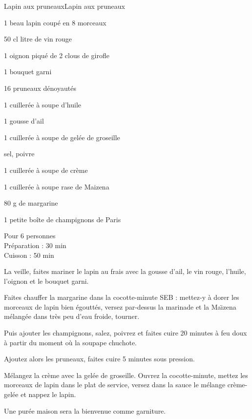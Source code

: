 \begin{recette}{Lapin aux pruneaux}{Lapin aux pruneaux}

\begin{ingredients}
1 beau lapin coupé en 8 morceaux\par
50 cl litre de vin rouge\par
1 oignon piqué de 2 clous de girofle\par
1 bouquet garni\par
16 pruneaux dénoyautés\par
1 cuillerée à soupe d’huile\par
1 gousse d’ail\par
1 cuillerée à soupe de gelée de groseille\par
sel, poivre\par
1 cuillerée à soupe de crème\par
1 cuillerée à soupe rase de Maizena\par
80 g de margarine\par
1 petite boîte de champignons de Paris\par
\end{ingredients}

\begin{infos}
Pour 6 personnes\\
Préparation : 30 min\\
Cuisson : 50 min\\
\end{infos}

\begin{etapes}
\item La veille, faites mariner le lapin au frais avec la gousse d’ail, le vin rouge, l’huile, l’oignon et le bouquet garni.
\item Faites chauffer la margarine dans la cocotte-minute SEB : mettez-y à dorer les morceaux de lapin bien égouttés, versez par-dessus la marinade et la Ma\"\i zena mélangée dans très peu d’eau froide, tourner.
\item Puis ajouter les champignons, salez, poivrez et faites cuire 20 minutes à feu doux à partir du moment où la soupape chuchote.
\item Ajoutez alors les pruneaux, faites cuire 5 minutes sous pression.
\item Mélangez la crème avec la gelée de groseille. Ouvrez la cocotte-minute, mettez les morceaux de lapin dans le plat de service, versez dans la sauce le mélange crème-gelée et nappez le lapin.
\end{etapes}

\begin{conseils}
Une purée maison sera la bienvenue comme garniture.
\end{conseils}

\end{recette}